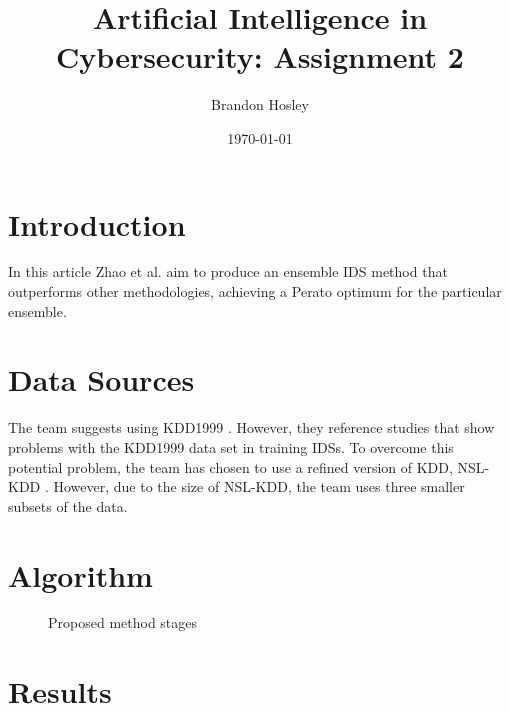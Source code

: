 \documentclass[]{article}
\title{Artificial Intelligence in Cybersecurity: Assignment 2}
\author{Brandon Hosley}
\date{\today}
\begin{document}
	\maketitle
	
\section{Introduction}

In this article \cite{Zhao2020} Zhao et al. aim to produce an ensemble IDS method that outperforms other methodologies, achieving a Perato optimum for the particular ensemble.

\section{Data Sources}

The team suggests using KDD1999 \cite{Kdd1999}. However, they reference studies
\cite{Brown2009, Mchugh2000, Engen2010}
that show problems with the KDD1999 data set in training IDSs.
To overcome this potential problem, the team has chosen to use a refined version of KDD, NSL-KDD \cite{Tavallaee2011}.
However, due to the size of NSL-KDD, the team uses three smaller subsets of the data.

\section{Algorithm}




\begin{figure}[h]
	\centering
	\begin{subfigure}
		\texttt{[image: Stage\_1]}
	\end{subfigure}
	\begin{subfigure}
		\texttt{[image: Stage\_2]}
	\end{subfigure}
	\caption{Proposed method stages \cite{Zhao2020}}
\end{figure}


\section{Results}
\end{document}
